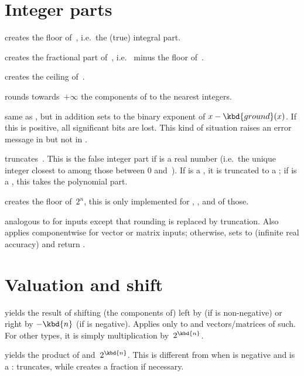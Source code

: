\section{Integer parts}

 creates the floor of~, i.e.\ the (true)
integral part.

 creates the fractional part of~, i.e.\ 
minus the floor of~.

 creates the ceiling of~.

 rounds towards~$+\infty$ the components of 
to the nearest integers.

 same as , but in addition sets
 to the binary exponent of $x - \kbd{ground}(x)$. If this is
positive, all significant bits are lost. This kind of situation raises an
error message in  but not in .

 truncates~. This is the false integer part
if  is a real number (i.e.~the unique integer closest to  among
those between 0 and~). If  is a , it is truncated
to a ; if  is a , this takes the polynomial part.

 creates the floor of~$2^n$, this is
only implemented for , ,  and  of
those.

 analogous to  for
 inputs except that rounding is replaced by truncation. Also applies
componentwise for vector or matrix inputs; otherwise, sets  to
 (infinite real accuracy) and return .

\section{Valuation and shift}

 yields the result of shifting
(the components of)  left by  (if  is non-negative)
or right by $-\kbd{n}$ (if  is negative). Applies only to 
and vectors/matrices of such. For other types, it is simply multiplication
by~$2^{\kbd{n}}$.

 yields the product of 
and~$2^{\kbd{n}}$. This is different from  when  is negative
and  is a :  truncates, while 
creates a fraction if necessary.

